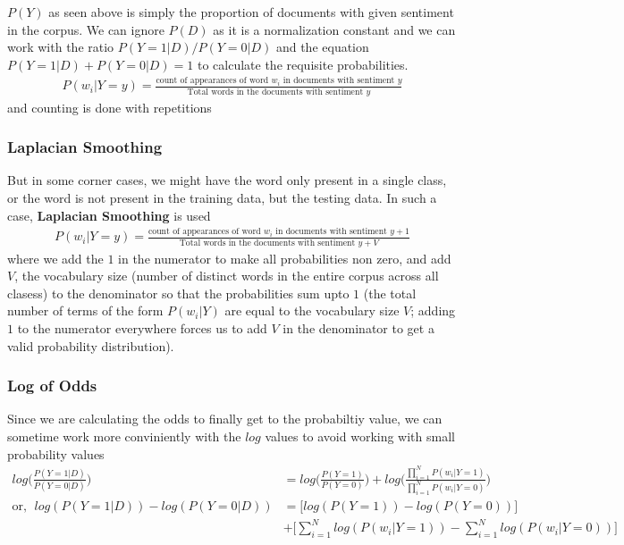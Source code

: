 \documentclass[../statistical_learning_notes.tex]{subfiles}
\begin{document}
$P(Y)$ as seen above is simply the proportion of documents with given sentiment in the corpus. We can ignore $P(D)$ as it is a normalization constant and we can work with the ratio $P(Y=1|D)/P(Y=0|D)$ and the equation $P(Y=1|D) + P(Y=0|D) = 1$ to calculate the requisite probabilities.
\begin{align*}
    P(w_{i}|Y=y) = \frac{\text{count of appearances of word $w_{i}$ in documents with sentiment $y$}}{\text{Total words in the documents with sentiment $y$}}
\end{align*}
and counting is done with repetitions

\subsubsection*{Laplacian Smoothing}
But in some corner cases, we might have the word only present in a single class, or the word is not present in the training data, but the testing data. In such a case, \textbf{Laplacian Smoothing} is used
\begin{align*}
    P(w_{i}|Y=y) = \frac{\text{count of appearances of word $w_{i}$ in documents with sentiment $y$} + 1}{\text{Total words in the documents with sentiment $y$}+V}
\end{align*}
where we add the $1$ in the numerator to make all probabilities non zero, and add $V$, the vocabulary size (number of distinct words in the entire corpus across all clasess) to the denominator so that the probabilities sum upto $1$ (the total number of terms of the form $P(w_{i}|Y)$ are equal to the vocabulary size $V$; adding $1$ to the numerator everywhere forces us to add $V$ in the denominator to get a valid probability distribution).

\subsubsection*{Log of Odds}
Since we are calculating the odds to finally get to the probabiltiy value, we can sometime work more conviniently with the $log$ values to avoid working with small probability values
\begin{align*}
    log \bigg( \frac{P(Y=1|D)}{P(Y=0|D)} \bigg) &= log \bigg( \frac{P(Y=1)}{P(Y=0)} \bigg) + log \bigg( \frac{\prod_{i=1}^{N} P(w_{i}|Y=1)}{\prod_{i=1}^{N} P(w_{i}|Y=0)} \bigg)\\
    \text{or, }\; log(P(Y=1|D)) - log(P(Y=0|D)) &= \big[ log(P(Y=1)) - log(P(Y=0)) \big] \\ &+ \big [ \sum_{i=1}^{N}log(P(w_{i}|Y=1)) - \sum_{i=1}^{N}log(P(w_{i}|Y=0)) \big]
\end{align*}
\end{document}
